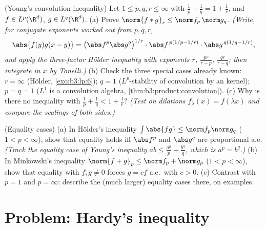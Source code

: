 \begin{exercise}[$\star\star\star$]\label{exo:b3:lp:11}
(Young's convolution inequality) Let $1 \leq p, q, r \leq
\infty$ with $\frac1p + \frac1q = 1 + \frac1r$, and $f \in
L^p(\R^d)$, $g \in L^q(\R^d)$.
(a) Prove $\norm{f * g}_r \leq \norm f_p\,\norm g_q$.
\emph{(Write, for conjugate exponents worked out from $p, q,
r$,
\[
\abs{f(y)g(x-y)} = \bigl(\abs f^p\abs g^q\bigr)^{1/r}
\cdot\abs f^{\,p(1/p - 1/r)}\cdot\abs g^{\,q(1/q - 1/r)},
\]
and apply the three-factor H\"older inequality with
exponents $r$, $\frac{pr}{r - p}$, $\frac{qr}{r - q}$; then
integrate in $x$ by Tonelli.)}
(b) Check the three special cases already known: $r =
\infty$ (H\"older, \cref{exo:b3:lp:6}); $q = 1$
($L^p$-stability of convolution by an  kernel);
$p = q = 1$ ($L^1$ is a convolution algebra,
\cref{thm:b3:product:convolution}).
(c) Why is there no inequality with $\frac1p + \frac1q < 1 +
\frac1r$? \emph{(Test on dilations $f_\lambda(x) =
f(\lambda x)$ and compare the scalings of both sides.)}
\end{exercise}

\begin{exercise}[$\star\star$]\label{exo:b3:lp:12}
(Equality cases) (a) In H\"older's inequality
$\int\abs{fg} \leq \norm f_p\norm g_q$ ($1 < p < \infty$),
show that equality holds iff $\abs f^p$ and $\abs g^q$ are
proportional a.e. \emph{(Track the equality case of Young's
inequality $ab \leq \frac{a^p}p + \frac{b^q}q$, which is $a^p
= b^q$.)}
(b) In Minkowski's inequality $\norm{f + g}_p \leq \norm f_p
+ \norm g_p$ ($1 < p < \infty$), show that equality with $f,
g \neq 0$ forces $g = cf$ a.e.\ with $c > 0$.
(c) Contrast with $p = 1$ and $p = \infty$: describe the
(much larger) equality cases there, on examples.
\end{exercise}

\section{Problem: Hardy's inequality}

